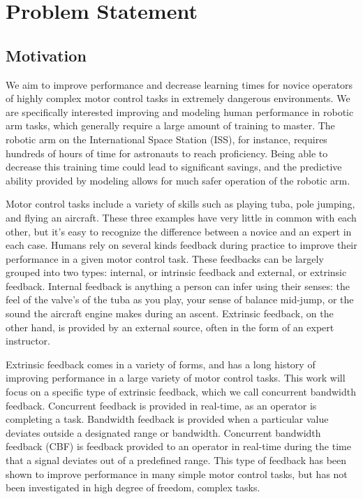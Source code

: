 \documentclass[float=false, crop=false]{standalone}
\begin{document}
\section{Problem Statement}
\subsection{Motivation}
We aim to improve performance and decrease learning times for novice operators of highly complex motor control tasks in extremely dangerous environments.
We are specifically interested improving and modeling human performance in robotic arm tasks, which generally require a large amount of training to master.
The robotic arm on the International Space Station (ISS), for instance, requires hundreds of hours of time for astronauts to reach proficiency.
Being able to decrease this training time could lead to significant savings, and the predictive ability provided by modeling allows for much safer operation of the robotic arm.

Motor control tasks include a variety of skills such as playing tuba, pole jumping, and flying an aircraft.
These three examples have very little in common with each other, but it’s easy to recognize the difference between a novice and an expert in each case.
Humans rely on several kinds feedback during practice to improve their performance in a given motor control task.
These feedbacks can be largely grouped into two types: internal, or intrinsic feedback and external, or extrinsic feedback.
Internal feedback is anything a person can infer using their senses: the feel of the valve’s of the tuba as you play, your sense of balance mid-jump, or the sound the aircraft engine makes during an ascent.
Extrinsic feedback, on the other hand, is provided by an external source, often in the form of an expert instructor.

Extrinsic feedback comes in a variety of forms, and has a long history of improving performance in a large variety of motor control tasks.
This work will focus on a specific type of extrinsic feedback, which we call concurrent bandwidth feedback.
Concurrent feedback is provided in real-time, as an operator is completing a task.
Bandwidth feedback is provided when a particular value deviates outside a designated range or bandwidth.
Concurrent bandwidth feedback (CBF) is feedback provided to an operator in real-time during the time that a signal deviates out of a predefined range.
This type of feedback has been shown to improve performance in many simple motor control tasks, but has not been investigated in high degree of freedom, complex tasks.
\end{document}
